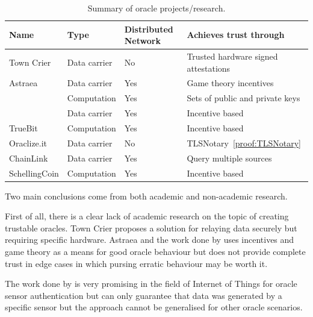 \begin{table}[]
  \centering
  \begin{tabular}{llll}
    \hline
    Name                                      & Type         & Distributed Network & Achieves trust through               \\ \hline
    Town Crier                                & Data carrier & No                  & Trusted hardware signed attestations \\
    Astraea                                   & Data carrier & Yes                 & Game theory incentives               \\
    \cite{Gordon2017ProvenanceSensorsb}       & Computation  & Yes                 & Sets of public and private keys      \\
    \cite{MontotoMonroy2018BitcoinBlockchain} & Data carrier & Yes                 & Incentive based                      \\
    TrueBit                                   & Computation  & Yes                 & Incentive based                      \\
    Oraclize.it                               & Data carrier & No                  & TLSNotary~\ref{proof:TLSNotary}      \\
    ChainLink                                 & Data carrier & Yes                 & Query multiple sources               \\
    SchellingCoin                             & Computation  & Yes                 & Incentive based                      \\ \hline
  \end{tabular}
  \caption{Summary of oracle projects/research.}
  \label{oracle-summary}
\end{table}

Two main conclusions come from both academic and non-academic research.


First of all, there is a clear lack of academic research on the topic of creating trustable oracles. Town Crier proposes a solution for relaying data securely but requiring specific hardware. Astraea and the work done by \cite{MontotoMonroy2018BitcoinBlockchain} uses incentives and game theory as a means for good oracle behaviour but does not provide complete trust in edge cases in which pursing erratic behaviour may be worth it.

The work done by \cite{Eberhardt2018Off-chainingComputations} is very promising in the field of Internet of Things for oracle sensor authentication but can only guarantee that data was generated by a specific sensor but the approach cannot be generalised for other oracle scenarios.

